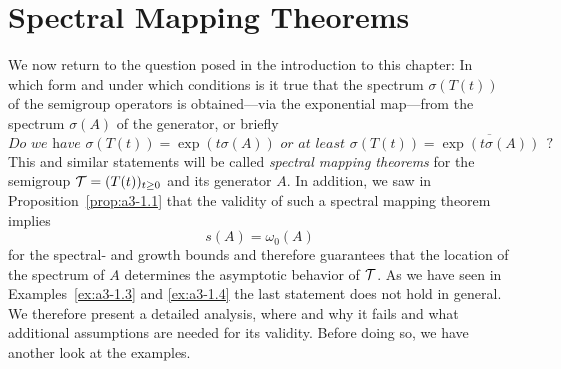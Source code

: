 \section{Spectral Mapping Theorems}\label{sec:a3-6}
We now return to the question posed in the introduction to this chapter: In which form and under which conditions is it true that the spectrum $\sigma(T(t))$ of the semigroup operators is obtained---via the exponential map---from the spectrum $\sigma(A)$ of the generator, or briefly
\[
\textit{Do we have } \sigma(T(t)) = \exp(t\sigma(A)) \textit{ or at least }
 \sigma(T(t)) = \overline{\exp(t\sigma(A))} ~~?
\]
This and similar statements will be called \emph{spectral mapping theorems} for the semigroup $\mathcal{T} = (T(t))_{t \geq 0}$ and its generator $A$.
In addition, we saw in Proposition~\ref{prop:a3-1.1} that the validity of such a spectral mapping theorem implies
\[
s(A) = \omega_{0}(A)
\]
for the spectral- and growth bounds and therefore guarantees that the location of the spectrum of $A$ determines the asymptotic behavior of $\mathcal{T}$.
As we have seen in Examples~\ref{ex:a3-1.3} and \ref{ex:a3-1.4} the last statement does not hold in general.
We therefore present a detailed analysis, where and why it fails and what additional assumptions are needed for its validity.
Before doing so, we have another look at the examples.
